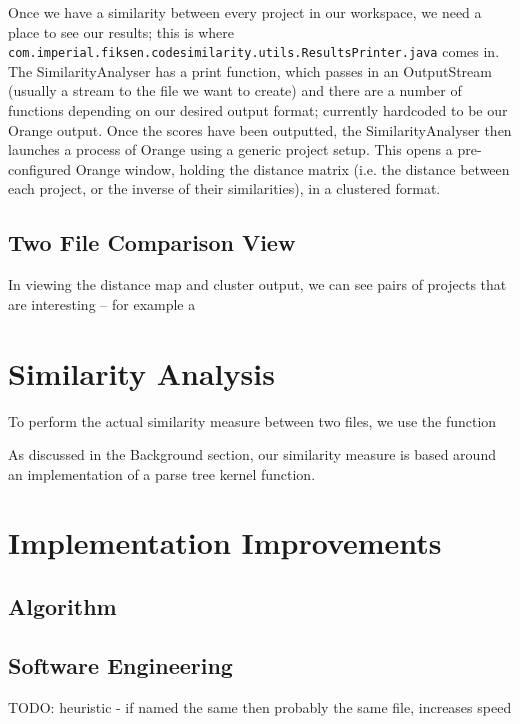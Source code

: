 Once we have a similarity between every project in our workspace, we need a place
to see our results; this is where 
\texttt{com.imperial.fiksen.codesimilarity.utils.ResultsPrinter.java} comes in.
The SimilarityAnalyser has a print function, which
passes in an OutputStream (usually a stream to the file we want to create) and
there are a number of functions depending on our desired output format; currently
hardcoded to be our Orange output. Once the scores have been outputted, the SimilarityAnalyser
then launches a process of Orange using a generic project setup. This opens a pre-
configured Orange window, holding the distance matrix (i.e. the distance between
each project, or the inverse of their similarities), in a clustered format.

\subsection{Two File Comparison View}

In viewing the distance map and cluster output, we can see pairs of projects that are
interesting -- for example a 

\section{Similarity Analysis}

To perform the actual similarity measure between two files, we use the function 

As discussed in the Background section, our similarity measure is based around an
implementation of a parse tree kernel function. 

\section{Implementation Improvements}
\subsection{Algorithm}

\subsection{Software Engineering}

TODO: heuristic - if named the same then probably the same file, increases speed
